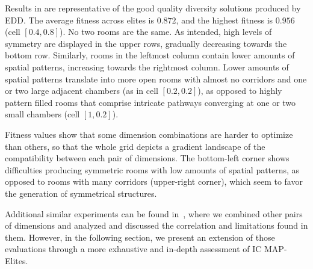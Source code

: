 Results in  are representative of the good quality diversity solutions produced by EDD. The average fitness across elites is $0.872$, and the highest fitness is $0.956$ (cell $[0.4,0.8]$). No two rooms are the same. As intended, high levels of symmetry are displayed in the upper rows, gradually decreasing towards the bottom row. Similarly, rooms in the leftmost column contain lower amounts of spatial patterns, increasing towards the rightmost column. Lower amounts of spatial patterns translate into more open rooms with almost no corridors and one or two large adjacent chambers (as in cell $[0.2, 0.2]$), as opposed to highly pattern filled rooms that comprise intricate pathways converging at one or two small chambers (cell $[1, 0.2]$). 

Fitness values show that some dimension combinations are harder to optimize than others, so that the whole grid depicts a gradient landscape of the compatibility between each pair of dimensions. The bottom-left corner shows difficulties producing symmetric rooms with low amounts of spatial patterns, as opposed to rooms with many corridors (upper-right corner), which seem to favor the generation of symmetrical structures.%

Additional similar experiments can be found in~\cite{p6alvarez2019empowering}, where we combined other pairs of dimensions and analyzed and discussed the correlation and limitations found in them. However, in the following section, we present an extension of those evaluations through a more exhaustive and in-depth assessment of IC MAP-Elites.



